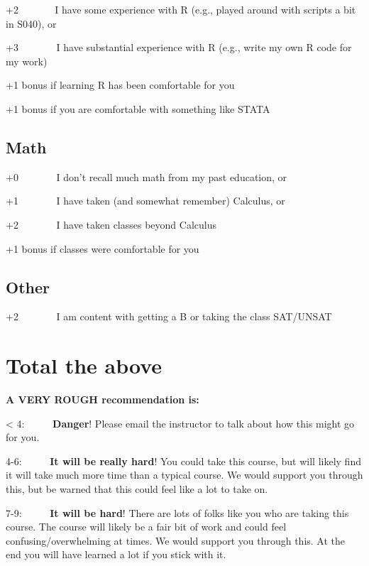 \documentclass[
  letterpaper,
  DIV=11,
  numbers=noendperiod]{scrreprt}
\begin{document}
+2 ~~~~~~ I have some experience with R (e.g., played around with
scripts a bit in S040), or

+3~~~~~~~ I have substantial experience with R (e.g., write my own R
code for my work)

+1 bonus if learning R has been comfortable for you

+1 bonus if you are comfortable with something like STATA

\hypertarget{math}{%
\subsection*{\texorpdfstring{\textbf{Math}}{Math}}\label{math}}

+0~~~~~~~ I don't recall much math from my past education, or

+1~~~~~~~ I have taken (and somewhat remember) Calculus, or

+2~~~~~~~ I have taken classes beyond Calculus

+1 bonus if classes were comfortable for you

\hypertarget{other}{%
\subsection*{\texorpdfstring{\textbf{Other}}{Other}}\label{other}}

+2~~~~~~~ I am content with getting a B or taking the class SAT/UNSAT

\hypertarget{total-the-above}{%
\section{Total the above}\label{total-the-above}}

\textbf{A VERY ROUGH recommendation is:}

\textless{} 4:~~~~~ \textbf{Danger}! Please email the instructor to talk
about how this might go for you.

4-6:~~~~~ \textbf{It will be really hard}! You could take this course,
but will likely find it will take much more time than a typical course.
We would support you through this, but be warned that this could feel
like a lot to take on.

7-9:~~~~~ \textbf{It will be hard}! There are lots of folks like you who
are taking this course. The course will likely be a fair bit of work and
could feel confusing/overwhelming at times. We would support you through
this. At the end you will have learned a lot if you stick with it.
\end{document}
